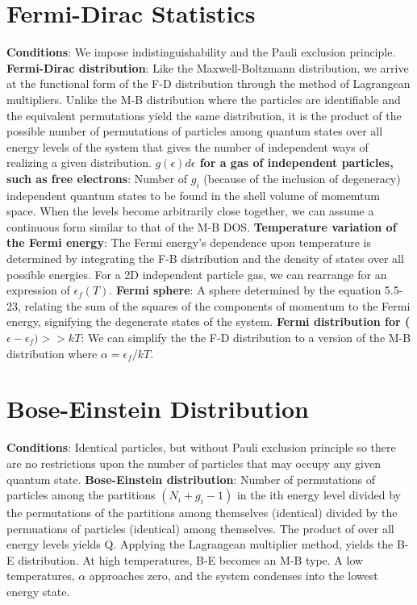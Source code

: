 \documentclass{article}
\numberwithin{equation}{section}
\begin{document}
\section*{Fermi-Dirac Statistics}
\textbf{Conditions}: We impose indistinguishability and the Pauli exclusion principle.
\newline 
\textbf{Fermi-Dirac distribution}: Like the Maxwell-Boltzmann distribution, we arrive at the functional form of the F-D distribution through the method of Lagrangean multipliers. Unlike the M-B distribution where the particles are identifiable and the equivalent permutations yield the same distribution, it is the product of the possible number of permutations of particles among quantum states over all energy levels of the system that gives the number of independent ways of realizing a given distribution.
\newline
\textbf{$g(\epsilon)d\epsilon$ for a gas of independent particles, such as free electrons}: Number of $g_i$ (because of the inclusion of degeneracy) independent quantum states to be found in the shell volume of momemtum space. When the levels become arbitrarily close together, we can assume a continuous form similar to that of the M-B DOS.
\newline
\textbf{Temperature variation of the Fermi energy}: The Fermi energy's dependence upon temperature is determined by integrating the F-B distribution and the density of states over all possible energies. For a 2D independent particle gas, we can rearrange for an expression of $\epsilon_f(T)$.
\newline
\textbf{Fermi sphere}: A sphere determined by the equation 5.5-23, relating the sum of the squares of the components of momentum to the Fermi energy, signifying the degenerate states of the system.
\newline
\textbf{Fermi distribution for ($\epsilon-\epsilon_f)>>kT$}: We can simplify the the F-D distribution to a version of the M-B distribution where $\alpha=\epsilon_f/kT$.
\newline
\section*{Bose-Einstein Distribution}
\textbf{Conditions}: Identical particles, but without Pauli exclusion principle so there are no restrictions upon the number of particles that may occupy any given quantum state.
\newline
\textbf{Bose-Einstein distribution}: Number of permutations of particles among the partitions $(N_i+g_i-1)$ in the ith energy level divided by the permutations of the partitions among themselves (identical) divided by the permuations of particles (identical) among themselves. The product of over all energy levels yields Q. Applying the Lagrangean multiplier method, yields the B-E distribution. At high temperatures, B-E becomes an M-B type. A low temperatures, $\alpha$ approaches zero, and the system condenses into the lowest energy state.
\newline
\end{document}
